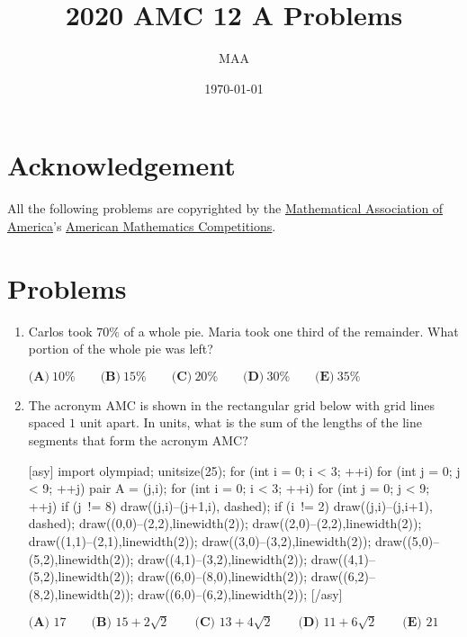 \documentclass{article}%
\title{2020 AMC 12 A Problems}%
\author{MAA}%
\date{\today}%
\begin{document}
%
\normalsize%
\maketitle%
\section{Acknowledgement}%
\label{sec:Acknowledgement}%
All the following problems are copyrighted by the \href{https://www.maa.org/}{Mathematical Association of America}'s \href{https://www.maa.org/math-competitions}{American Mathematics Competitions}.

%
\section{Problems}%
\label{sec:Problems}%
\begin{enumerate}%
\item%
[\textbf{Problem 1}]Carlos took $70\%$ of a whole pie. Maria took one third of the remainder. What portion of the whole pie was left?

$\textbf{(A)}\ 10\%\qquad\textbf{(B)}\ 15\%\qquad\textbf{(C)}\ 20\%\qquad\textbf{(D)}\ 30\%\qquad\textbf{(E)}\ 35\%$

%
\item%
[\textbf{Problem 2}]The acronym AMC is shown in the rectangular grid below with grid lines spaced $1$ unit apart. In units, what is the sum of the lengths of the line segments that form the acronym AMC$?$

[asy] import olympiad; unitsize(25); for (int i = 0; i < 3; ++i) { for (int j = 0; j < 9; ++j) { pair A = (j,i);  } } for (int i = 0; i < 3; ++i) { for (int j = 0; j < 9; ++j) { if (j != 8) { draw((j,i)--(j+1,i), dashed); } if (i != 2) { draw((j,i)--(j,i+1), dashed); } } } draw((0,0)--(2,2),linewidth(2)); draw((2,0)--(2,2),linewidth(2)); draw((1,1)--(2,1),linewidth(2)); draw((3,0)--(3,2),linewidth(2)); draw((5,0)--(5,2),linewidth(2)); draw((4,1)--(3,2),linewidth(2)); draw((4,1)--(5,2),linewidth(2)); draw((6,0)--(8,0),linewidth(2)); draw((6,2)--(8,2),linewidth(2)); draw((6,0)--(6,2),linewidth(2)); [/asy]

$\textbf{(A) } 17 \qquad \textbf{(B) } 15 + 2\sqrt{2} \qquad \textbf{(C) } 13 + 4\sqrt{2} \qquad \textbf{(D) } 11 + 6\sqrt{2} \qquad \textbf{(E) } 21$

%
\end{enumerate}

%
\end{document}
